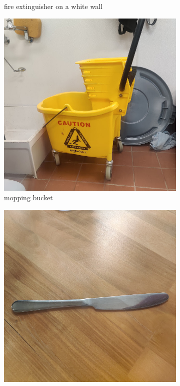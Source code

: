 \documentclass[]{article}
\begin{document}
\begin{figure}[h]
\begin{subfigure}[b]{0.2\textwidth}
        \caption{fire extinguisher on a white wall}
    \end{subfigure}
    \begin{subfigure}[b]{0.2\textwidth}
        \centering
        \includegraphics[width=\textwidth]{dataset/4.jpg}
        \caption{mopping bucket}
    \end{subfigure}
    \begin{subfigure}[b]{0.2\textwidth}
        \centering
        \includegraphics[width=\textwidth]{dataset/5.jpg}

\end{subfigure}
\end{figure}
\end{document}
